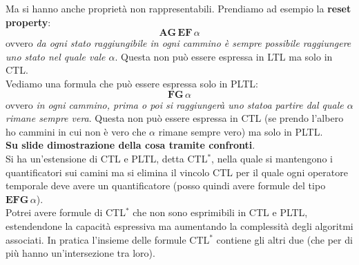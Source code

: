 Ma si hanno anche proprietà non rappresentabili. Prendiamo ad esempio la
\textbf{reset property}:
\[\mathbf{AG}\,\mathbf{EF}\,\alpha\]
ovvero \textit{da ogni stato raggiungibile in ogni cammino è sempre possibile
  raggiungere uno stato nel quale vale $\alpha$}. Questa non può essere espressa
in LTL ma solo in CTL.\\
Vediamo una formula che può essere espressa solo in PLTL:
\[\mathbf{FG}\,\alpha\]
ovvero \textit{in ogni cammino, prima o poi si raggiungerà uno statoa partire
  dal quale $\alpha$ rimane sempre vera}. Questa non può essere espressa
in CTL (se prendo l'albero ho cammini in cui non è vero che $\alpha$ rimane
sempre vero) ma solo in PLTL.\\
\textbf{Su slide dimostrazione della cosa tramite confronti}.\\
Si ha un'estensione di CTL e PLTL, detta CTL$^*$, nella quale si mantengono i
quantificatori sui camini ma si elimina il vincolo CTL per il quale ogni
operatore temporale deve avere un quantificatore (posso quindi avere formule del
tipo $\mathbf{EFG}\,\alpha$).\\ 
Potrei avere formule di CTL$^*$ che non sono esprimibili in CTL e
PLTL, estendendone la capacità espressiva ma aumentando la complessità degli
algoritmi associati. In pratica l'insieme delle formule CTL$^*$ contiene gli
altri due (che per di più hanno un'intersezione tra loro).

